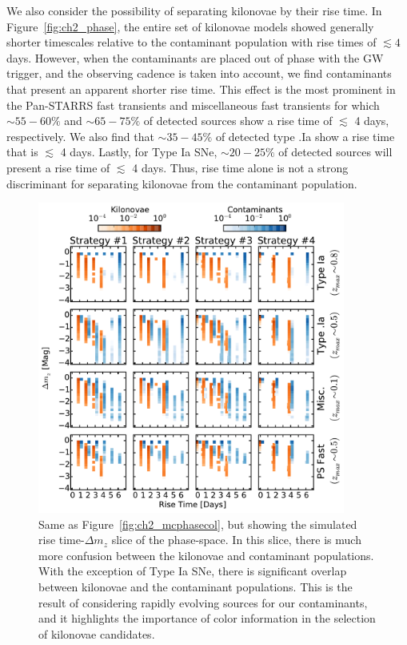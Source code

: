 We also consider the possibility of separating kilonovae by their rise time. In Figure~\ref{fig:ch2_phase}, the entire set of kilonovae models showed generally shorter timescales relative to the contaminant population with rise times of $\lesssim4$ days. However, when the contaminants are placed out of phase with the GW trigger, and the observing cadence is taken into account, we find contaminants that present an apparent shorter rise time. This effect is the most prominent in the Pan-STARRS fast transients and miscellaneous fast transients for which $\sim55-60\%$ and $\sim65-75\%$ of detected sources show a rise time of $\lesssim$ 4 days, respectively. We also find that $\sim 35-45\%$ of detected type .Ia show a rise time that is $\lesssim$ 4 days. Lastly, for Type Ia SNe, $\sim20-25\%$ of detected sources will present a rise time of $\lesssim$ 4 days. Thus, rise time alone is not a strong discriminant for separating kilonovae from the contaminant population.

\begin{figure}[t!]
\centering
\includegraphics[width=0.9\textwidth]{./figs/chapter2/ch2_f9.pdf}
\caption{Same as Figure~\ref{fig:ch2_mcphasecol}, but showing the simulated rise time-$\Delta m_z$ slice of the phase-space. In this slice, there is much more confusion between the kilonovae and contaminant populations. With the exception of Type Ia SNe, there is significant overlap between kilonovae and the contaminant populations. This is the result of considering rapidly evolving sources for our contaminants, and it highlights the importance of color information in the selection of kilonovae candidates.}
\label{fig:ch2_mcphasedm}
\end{figure}

